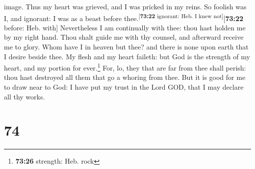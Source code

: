image.  Thus my heart was grieved, and I was pricked in
my reins.  So foolish was I, and ignorant: I was as a
beast before thee.\textsuperscript{{[}\textbf{73:22} ignorant: Heb. I
knew not{]}}{[}\textbf{73:22} before: Heb. with{]} 
Nevertheless I am continually with thee: thou hast holden me by my right
hand.  Thou shalt guide me with thy counsel, and
afterward receive me to glory.  Whom have I in heaven but
thee? and there is none upon earth that I desire beside thee.
 My flesh and my heart faileth: but God is the strength
of my heart, and my portion for ever.\footnote{\textbf{73:26} strength:
  Heb. rock}  For, lo, they that are far from thee shall
perish: thou hast destroyed all them that go a whoring from thee.
 But it is good for me to draw near to God: I have put my
trust in the Lord GOD, that I may declare all thy works.

\hypertarget{section-73}{%
\section{74}\label{section-73}}

